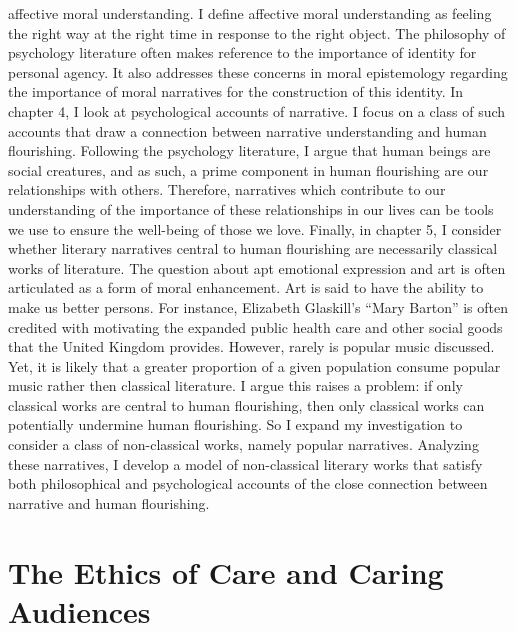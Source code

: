\documentclass[phdthesis,12pt,final]{wuthesis}
\theoremstyle{definition}
\theoremstyle{definition}
\theoremstyle{definition}
\theoremstyle{definition}
\theoremstyle{remark}
\begin{document}
affective moral understanding. I define affective moral understanding as feeling the right way at the right time in response to the right object. The philosophy of psychology literature often makes reference to the importance of identity for personal agency. It also addresses these concerns in moral epistemology regarding the importance of moral narratives for the construction of this identity. In chapter 4, I look at psychological accounts of narrative. I focus on a class of such accounts that draw a connection between narrative understanding and human flourishing. Following the psychology literature, I argue that human beings are social creatures, and as such, a prime component in human flourishing are our relationships with others. Therefore, narratives which contribute to our understanding of the importance of these relationships in our lives can be tools we use to ensure the well-being of those we love. Finally, in chapter 5, I consider whether literary narratives central to human flourishing are necessarily classical works of literature. The question about apt emotional expression and art is often articulated as a form of moral enhancement. Art is said to have the ability to make us better persons. For instance, Elizabeth Glaskill's ``Mary Barton'' is often credited with motivating the expanded public health care and other social goods that the United Kingdom provides. However, rarely is popular music discussed. Yet, it is likely that a greater proportion of a given population consume popular music rather then classical literature. I argue this raises a problem: if only classical works are central to human flourishing, then only classical works can potentially undermine human flourishing. So I expand my investigation to consider a class of non-classical works, namely popular narratives. Analyzing these narratives, I develop a model of non-classical literary works that satisfy both philosophical and psychological accounts of the close connection between narrative and human flourishing.

\section{The Ethics of Care and Caring Audiences}\label{the-ethics-of-care-and-caring-audiences}
\end{document}
